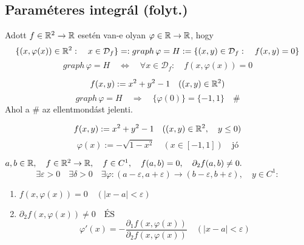 \documentclass[a4paper,11.5pt]{article}
\begin{document}
	\subsection{Paraméteres integrál (folyt.)}
	\begin{note}
		Adott $f\in\mathbb{R}^2\to\mathbb{R}$ esetén van-e olyan $\varphi\in\mathbb{R}\to\mathbb{R}$, hogy
		\[ \{ (x,\varphi(x))\in\mathbb{R}^2:\quad x\in\mathcal{D}_f \}=:graph\,\varphi=H:=\{ (x,y)\in\mathcal{D}_f:\quad f(x,y)=0 \} \]
		\[ graph\,\varphi=H\quad \Leftrightarrow\quad \forall x\in\mathcal{D}_f:\quad f(x,\varphi(x))=0 \]
	\end{note}
	\begin{example}
		\[ f(x,y):=x^2+y^2-1 \quad ((x,y)\in\mathbb{R}^2)\]
		\[ graph\,\varphi=H\quad \Rightarrow\quad \{ \varphi(0) \}=\{-1,1\}\quad \# \]
		Ahol a \# az ellentmondást jelenti.
	\end{example}
	\begin{example}
		\[ f(x,y):=x^2+y^2-1\quad ((x,y)\in\mathbb{R}^2,\quad y\leq 0) \]
		\[ \varphi(x):=-\sqrt{1-x^2}\quad (x\in[-1,1])\quad \text{jó} \]
	\end{example}
	\begin{theorem}
		$a,b\in\mathbb{R},\quad f\in\mathbb{R}^2\to\mathbb{R},\quad f\in C^1,\quad f(a,b)=0,\quad \partial_2f(a,b)\not=0.$
		\[ \exists \varepsilon>0\quad \exists\delta>0\quad \exists\varphi:(a-\varepsilon,a+\varepsilon)\to(b-\varepsilon,b+\varepsilon),\quad y\in C^1: \]
		\begin{enumerate}
			\item 
			$ f(x,\varphi(x))=0\quad (|x-a|<\varepsilon) $
			\item $\partial_2f(x,\varphi(x))\not=0\quad \text{ÉS}$
			\[ \varphi'(x)= -\frac{\partial_1f(x,\varphi(x))}{\partial_2f(x,\varphi(x))}\quad (|x-a|<\varepsilon) \]
		\end{enumerate}
	\end{theorem}
\end{document}
